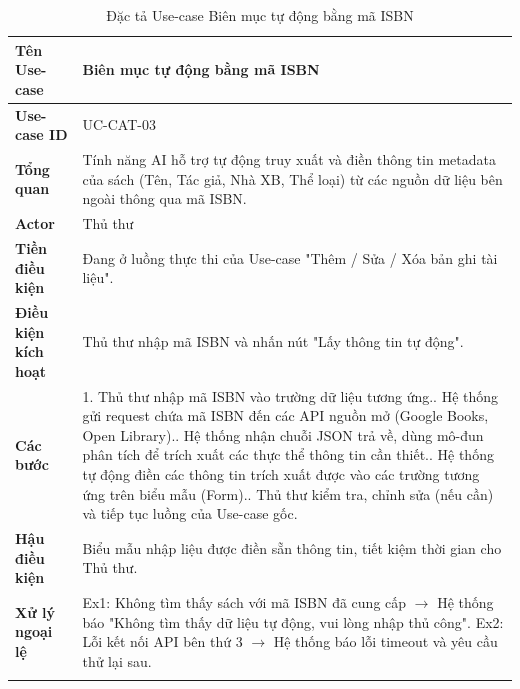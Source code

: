 \begin{longtable}{|p{3.5cm}|p{11.5cm}|}
    \hline
    \textbf{Tên Use-case} & \textbf{Biên mục tự động bằng mã ISBN } \\
    \hline
    \textbf{Use-case ID} & UC-CAT-03 \\
    \hline
    \textbf{Tổng quan} & Tính năng AI hỗ trợ tự động truy xuất và điền thông tin metadata của sách (Tên, Tác giả, Nhà XB, Thể loại) từ các nguồn dữ liệu bên ngoài thông qua mã ISBN. \\
    \hline
    \textbf{Actor} & Thủ thư \\
    \hline
    \textbf{Tiền điều kiện} & Đang ở luồng thực thi của Use-case "Thêm / Sửa / Xóa bản ghi tài liệu". \\
    \hline
    \textbf{Điều kiện kích hoạt} & Thủ thư nhập mã ISBN và nhấn nút "Lấy thông tin tự động". \\
    \hline
    \textbf{Các bước} & 
    1. Thủ thư nhập mã ISBN vào trường dữ liệu tương ứng.\newline
    2. Hệ thống gửi request chứa mã ISBN đến các API nguồn mở (Google Books, Open Library).\newline
    3. Hệ thống nhận chuỗi JSON trả về, dùng mô-đun phân tích để trích xuất các thực thể thông tin cần thiết.\newline
    4. Hệ thống tự động điền các thông tin trích xuất được vào các trường tương ứng trên biểu mẫu (Form).\newline
    5. Thủ thư kiểm tra, chỉnh sửa (nếu cần) và tiếp tục luồng của Use-case gốc. \\
    \hline
    \textbf{Hậu điều kiện} & Biểu mẫu nhập liệu được điền sẵn thông tin, tiết kiệm thời gian cho Thủ thư. \\
    \hline
    \textbf{Xử lý ngoại lệ} & 
    Ex1: Không tìm thấy sách với mã ISBN đã cung cấp $\rightarrow$ Hệ thống báo "Không tìm thấy dữ liệu tự động, vui lòng nhập thủ công".\newline
    Ex2: Lỗi kết nối API bên thứ 3 $\rightarrow$ Hệ thống báo lỗi timeout và yêu cầu thử lại sau. \\
    \hline
    \caption{Đặc tả Use-case Biên mục tự động bằng mã ISBN}
\end{longtable}

